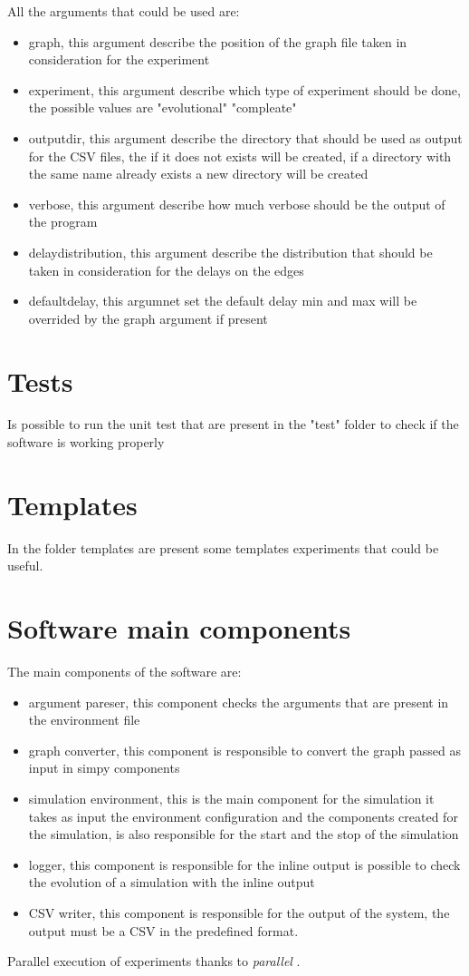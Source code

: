 \documentclass[10pt,conference,letterpaper]{IEEEtran}
\begin{document}
All the arguments that could be used are:
\begin{itemize}
		\item graph, this argument describe the position of the graph file taken
			in consideration for the experiment
		\item experiment, this argument describe which type of experiment should
			be done, the possible values are "evolutional" "compleate"
		\item outputdir, this argument describe the directory that should be
			used as output for the CSV files, the if it does not exists will be
			created, if a directory with the same name already exists a new 
			directory will be created
		\item verbose, this argument describe how much verbose should be the
			output of the program
		\item delaydistribution, this argument describe the distribution that
			should be taken in consideration for the delays on the edges
		\item defaultdelay, this argumnet set the default delay min and max
			will be overrided by the graph argument if present
\end{itemize}

\section{Tests}
\label{sec:test}
Is possible to run the unit test that are present in the "test" folder to
check if the software is working properly

\section{Templates}
\label{sec:templates}
In the folder templates are present some templates experiments that could
be useful.

\section{Software main components}
\label{sec:softwarecomp}

The main components of the software are:
\begin{itemize}
		\item argument pareser, this component checks the arguments that are
			present in the environment file
		\item graph converter, this component is responsible to convert the
			graph passed as input in simpy components
		\item simulation environment, this is the main component for the simulation
			it takes as input the environment configuration and the components
			created for the simulation, is also responsible for the start and
			the stop of the simulation
		\item logger, this component is responsible for the inline output
			is possible to check the evolution of a simulation with the inline
			output
		\item CSV writer, this component is responsible for the output of the 
			system, the output must be a CSV in the predefined format.
\end{itemize}

Parallel execution of experiments thanks to \textit{parallel} \cite{Tange2011a}.



\end{document}
